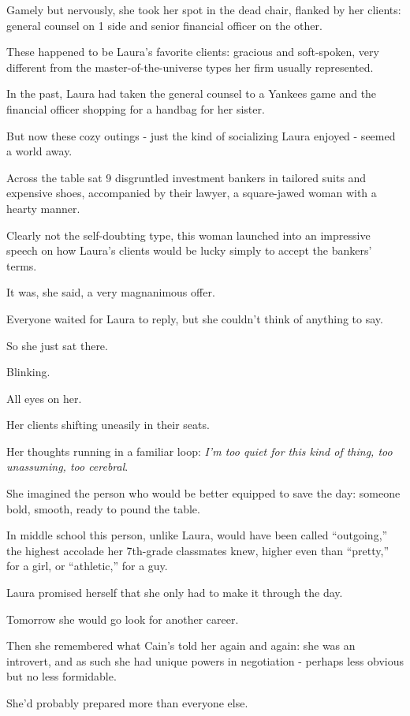 \documentclass[oneside]{article}
\numberwithin{equation}{section}
\begin{document}
Gamely but nervously, she took her spot in the dead chair, flanked by her clients: general counsel on 1 side and senior financial officer on the other.

These happened to be Laura's favorite clients: gracious and soft-spoken, very different from the master-of-the-universe types her firm usually represented.

In the past, Laura had taken the general counsel to a Yankees game and the financial officer shopping for a handbag for her sister.

But now these cozy outings - just the kind of socializing Laura enjoyed - seemed a world away.

Across the table sat 9 disgruntled investment bankers in tailored suits and expensive shoes, accompanied by their lawyer, a square-jawed woman with a hearty manner.

Clearly not the self-doubting type, this woman launched into an impressive speech on how Laura's clients would be lucky simply to accept the bankers' terms.

It was, she said, a very magnanimous offer.

%
Everyone waited for Laura to reply, but she couldn't think of anything to say.

So she just sat there.

Blinking.

All eyes on her.

Her clients shifting uneasily in their seats.

Her thoughts running in a familiar loop: \textit{I'm too quiet for this kind of thing, too unassuming, too cerebral}.

She imagined the person who would be better equipped to save the day: someone bold, smooth, ready to pound the table.

In middle school this person, unlike Laura, would have been called ``outgoing,'' the highest accolade her 7th-grade classmates knew, higher even than ``pretty,'' for a girl, or ``athletic,'' for a guy.

Laura promised herself that she only had to make it through the day.

Tomorrow she would go look for another career.

%
Then she remembered what Cain's told her again and again: she was an introvert, and as such she had unique powers in negotiation - perhaps less obvious but no less formidable.

She'd probably prepared more than everyone else.
\end{document}
